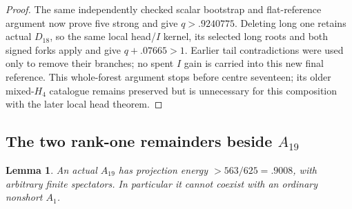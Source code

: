 \documentclass[11pt]{article}
\newtheorem{lemma}[theorem]{Lemma}
\theoremstyle{definition}
\theoremstyle{remark}
\begin{document}
\begin{proof}
The same independently checked scalar bootstrap and flat-reference
argument now prove five strong and give $q>.9240775$.
Deleting long one retains actual $D_{18}$, so the same local head/$I$
kernel, its selected long roots and both signed forks apply and give
$q+.07665>1$. Earlier tail contradictions were used only to remove
their branches; no spent $I$ gain is carried into this new final
reference. This whole-forest argument stops before centre seventeen;
its older mixed-$H_4$ catalogue remains preserved but is unnecessary
for this composition with the later local head theorem.
\end{proof}

\subsection{The two rank-one remainders beside $A_{19}$}
\label{app:tail:A19rankone}
\begin{lemma}
\label{app:tail:lem:A19ordinary}
An actual $A_{19}$ has projection energy $>563/625=.9008$,
with arbitrary finite spectators. In particular it cannot coexist
with an ordinary nonshort $A_1$.
\end{lemma}
\end{document}

